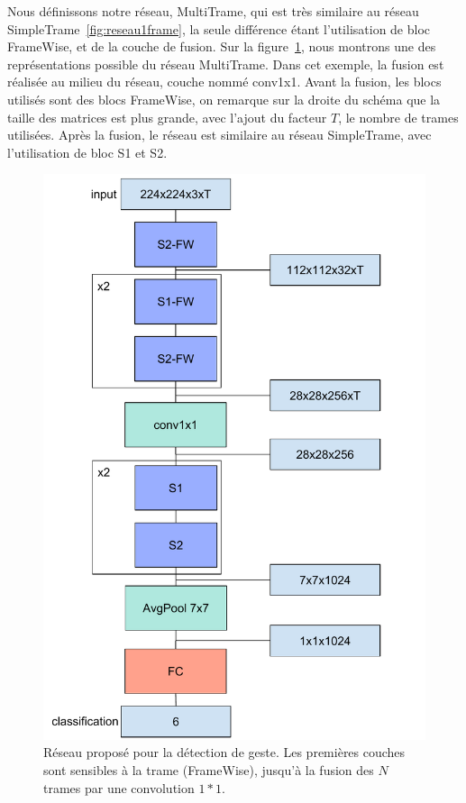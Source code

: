 Nous définissons notre réseau, MultiTrame, qui est très similaire au réseau SimpleTrame~\ref{fig:reseau1frame}, la seule différence étant l'utilisation de bloc FrameWise, et de la couche de fusion.
Sur la figure~\ref{fig:reseau1}, nous montrons une des représentations possible du réseau MultiTrame.
Dans cet exemple, la fusion est réalisée au milieu du réseau, couche nommé conv1x1. 
Avant la fusion, les blocs utilisés sont des blocs FrameWise, on remarque sur la droite du schéma que la taille des matrices est plus grande, avec l'ajout du facteur $T$, le nombre de trames utilisées.
Après la fusion, le réseau est similaire au réseau SimpleTrame, avec l'utilisation de bloc S1 et S2.

\begin{figure}%
\includegraphics[width=.9\textwidth]{figures/Reseau1.pdf}%
\caption{Réseau proposé pour la détection de geste. Les premières couches sont sensibles à la trame (FrameWise), jusqu'à la fusion des $N$ trames par une convolution $1*1$.}%
\label{fig:reseau1}%
\end{figure}

